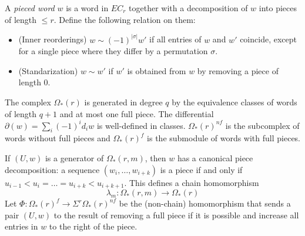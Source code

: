 	A \emph{pieced word} $w$ is a word in $EC_r$ together with a decomposition of $w$ into pieces of length $\leq r$. Define the following relation on them:
	\begin{itemize}
		\item (Inner reorderings) $w\sim (-1)^{|\sigma|}w'$ if all entries of $w$ and $w'$ coincide, except for a single piece where they differ by a permutation $\sigma$.
		\item (Standarization) $w\sim w'$ if $w'$ is obtained from $w$ by removing a piece of length $0$.
	\end{itemize}
	The complex $\Omega_*(r)$ is generated in degree $q$ by the equivalence classes of words of length $q+1$ and at most one full piece.
	The differential $\partial(w) = \sum_{i} (-1)^id_iw$ is well-defined in classes. $\Omega_*(r)^{nf}$ is the subcomplex of words without full pieces and $\Omega_*(r)^{f}$ is the submodule of words with full pieces.



	If $(U,w)$ is a generator of $\Omega_*(r,m)$, then $w$ has a canonical piece decomposition: a sequence $(w_i,\ldots,w_{i+k})$ is a piece if and only if $u_{i-1}<u_i =\ldots= u_{i+k}<u_{i+k+1}$. This defines a chain homomorphism
	\[\lambda_m\colon \Omega_*(r,m)\to \Omega_*(r)\]
	Let $\Phi\colon \Omega_*(r)^f\to \Sigma^{r}\Omega_{*}(r)^{nf}$ be the (non-chain) homomorphism that sends a pair $(U,w)$ to the result of removing a full piece if it is possible and increase all entries in $w$ to the right of the piece.




